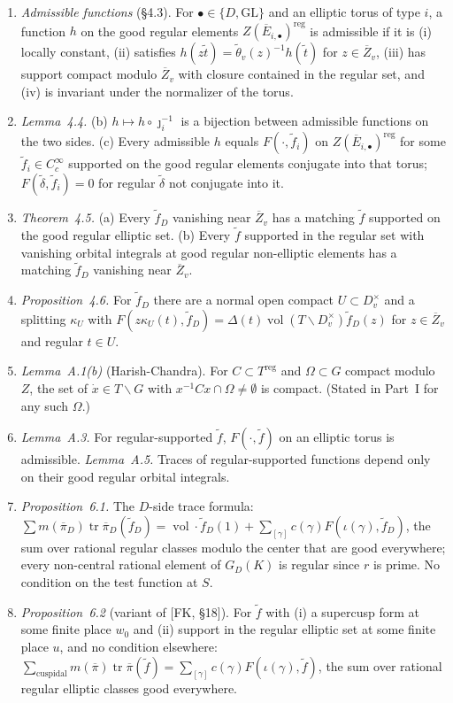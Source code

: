 \documentclass[12pt]{article}
\newcommand{\ov}[1]{\overline{#1}}
\newcommand{\reg}{\mathrm{reg}}
\newcommand{\tr}{\operatorname{tr}}
\newcommand{\vol}{\operatorname{vol}}
\newcommand{\GL}{\mathrm{GL}}
\newcommand{\Zb}{\ov{Z}}
\newcommand{\pib}{\ov{\pi}}
\newcommand{\Eb}{\ov{E}}
\newcommand{\jj}{\jmath}
\theoremstyle{plain}
\theoremstyle{definition}
\begin{document}
\begin{enumerate}[label=(I\arabic*)]
\item \emph{Admissible functions} (\S4.3). For $\bullet\in\{D,\GL\}$ and an elliptic torus of type $i$, a function $h$ on the good regular elements $Z(\Eb_{i,\bullet})^{\reg}$ is admissible if it is (i) locally constant, (ii) satisfies $h(z\tilde t)=\tilde\theta_v(z)^{-1}h(\tilde t)$ for $z\in\Zb_v$, (iii) has support compact modulo $\Zb_v$ with closure contained in the regular set, and (iv) is invariant under the normalizer of the torus.
\item \emph{Lemma~4.4.} (b) $h\mapsto h\circ\jj_i^{-1}$ is a bijection between admissible functions on the two sides. (c) Every admissible $h$ equals $F(\cdot,\tilde f_i)$ on $Z(\Eb_{i,\bullet})^{\reg}$ for some $\tilde f_i\in C_c^\infty$ supported on the good regular elements conjugate into that torus; $F(\tilde\delta,\tilde f_i)=0$ for regular $\tilde\delta$ not conjugate into it.
\item \emph{Theorem~4.5.} (a) Every $\tilde f_D$ vanishing near $\Zb_v$ has a matching $\tilde f$ supported on the good regular elliptic set. (b) Every $\tilde f$ supported in the regular set with vanishing orbital integrals at good regular non-elliptic elements has a matching $\tilde f_D$ vanishing near $\Zb_v$.
\item \emph{Proposition~4.6.} For $\tilde f_D$ there are a normal open compact $U\subset D_v^\times$ and a splitting $\kappa_U$ with $F(z\kappa_U(t),\tilde f_D)=\Delta(t)\vol(T\backslash D_v^\times)\tilde f_D(z)$ for $z\in\Zb_v$ and regular $t\in U$.
\item \emph{Lemma~A.1(b)} (Harish-Chandra). For $C\subset T^{\reg}$ and $\Omega\subset G$ compact modulo $Z$, the set of $\dot x\in T\backslash G$ with $x^{-1}Cx\cap\Omega\ne\emptyset$ is compact. (Stated in Part~I for any such $\Omega$.)
\item \emph{Lemma~A.3.} For regular-supported $\tilde f$, $F(\cdot,\tilde f)$ on an elliptic torus is admissible. \emph{Lemma~A.5.} Traces of regular-supported functions depend only on their good regular orbital integrals.
\item \emph{Proposition~6.1.} The $D$-side trace formula: $\sum m(\pib_D)\tr\pib_D(\tilde f_D)=\vol\cdot\tilde f_D(1)+\sum_{[\gamma]}c(\gamma)F(\iota(\gamma),\tilde f_D)$, the sum over rational regular classes modulo the center that are good everywhere; every non-central rational element of $G_D(K)$ is regular since $r$ is prime. No condition on the test function at $S$.
\item \emph{Proposition~6.2} (variant of [FK, \S18]). For $\tilde f$ with (i) a supercusp form at some finite place $w_0$ and (ii) support in the regular elliptic set at some finite place $u$, and no condition elsewhere: $\sum_{\text{cuspidal}}m(\pib)\tr\pib(\tilde f)=\sum_{[\gamma]}c(\gamma)F(\iota(\gamma),\tilde f)$, the sum over rational regular elliptic classes good everywhere.

\end{enumerate}
\end{document}
